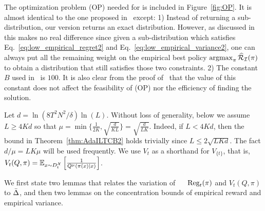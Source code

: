 The optimization problem (OP) needed for \AdaILTCB is included in Figure~\ref{fig:OP}.
It is almost identical to the one proposed in~\citep{AgarwalHsKaLaLiSc14} except:
1) Instead of returning a sub-distribution, our version returns an exact distribution.
However, as discussed in~\citep{AgarwalHsKaLaLiSc14} this makes no real difference
since given a sub-distribution which satisfies Eq.~\eqref{eq:low_empirical_regret2}
and Eq.~\eqref{eq:low_empirical_variance2}, one can always put all the remaining 
weight on the empirical best policy $\operatorname*{argmax}_\pi \widehat{\cal{R}}_{\mathcal{I}}(\pi)$ to obtain a distribution 
that still satisfies those two constraints.
2) The constant $B$ used in~\citep{AgarwalHsKaLaLiSc14} is $100$.
It is also clear from the proof of~\citep{AgarwalHsKaLaLiSc14} that the value of this constant 
does not affect the feasibility of (OP) nor the efficiency of finding the solution.

Let $d = \ln(8T^2N^2/\delta)\ln(L)$. 
Without loss of generality, below we assume $L \geq 4Kd$ so that 
$\mu = \min\{\frac{1}{2K}, \sqrt{\frac{d}{KL}}\} = \sqrt{\frac{d}{LK}}$.
Indeed, if $L < 4Kd$, then the bound in Theorem~\ref{thm:AdaILTCB2} holds trivially since $L \leq 2\sqrt{LKd}$.
The fact $d/\mu  = LK\mu$ will be used frequently.
We use $V_t$ as a shorthand for $V_{\{t\}}$, that is, $V_t(Q, \pi) = \mathbb{E}_{x \sim D_t^{\mathcal{X}}} \left[ \frac{1}{Q^{\mu}(\pi(x) | x)} \right]$.

We first state two lemmas that relates the variation of $\Reg_t(\pi)$ and $V_t(Q,\pi)$ to $\bar{\Delta}$, and then two lemmas on the concentration bounds of empirical reward and empirical variance.

